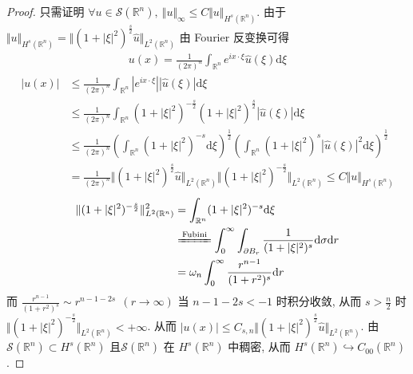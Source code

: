 \documentclass[11pt]{ctexart}[UTF8]
\begin{document}
\begin{proof}
    只需证明 $\forall u \in \mathscr{S}(\mathbb{R}^n),\ \Vert u \Vert_{\infty} \leq C\Vert u \Vert_{H^{s}(\mathbb{R}^n)}$. 由于
    $\Vert u \Vert_{H^{s}(\mathbb{R}^n)} = \Vert (1+|\xi|^{2})^{\frac{s}{2}}\widehat{u} \Vert_{L^{2}(\mathbb{R}^{n})}$ 由 Fourier 反变换可得
    \begin{equation*}
        \begin{aligned}
            u(x) = \frac{1}{(2\pi)^{n}} \int_{\mathbb{R}^n} e^{ix\cdot \xi}\widehat{u}(\xi) \mathrm{d}\xi 
        \end{aligned}
    \end{equation*}
    \begin{equation*}
        \begin{aligned}
            |u(x)| &\leq \frac{1}{(2\pi)^{n}} \int_{\mathbb{R}^n} |e^{ix\cdot \xi}||\widehat{u}(\xi)| \mathrm{d}\xi \\
                     &\leq \frac{1}{(2\pi)^{n}} \int_{\mathbb{R}^n} (1+|\xi|^{2})^{-\frac{s}{2}}(1+|\xi|^{2})^{\frac{s}{2}}|\widehat{u}(\xi)| \mathrm{d}\xi \\
                     &\leq \frac{1}{(2\pi)^{n}} \left( \int_{\mathbb{R}^n} (1+|\xi|^{2})^{-s} \mathrm{d}\xi \right)^{\frac{1}{2}} \left( \int_{\mathbb{R}^n} (1+|\xi|^{2})^{s} |\widehat{u}(\xi)|^2 \mathrm{d}\xi \right)^{\frac{1}{2}}\\
                     & = \frac{1}{(2\pi)^{n}}\Vert (1+|\xi|^{2})^{\frac{s}{2}}\widehat{u} \Vert_{L^{2}(\mathbb{R}^{n})} \Vert (1+|\xi|^{2})^{-\frac{s}{2}} \Vert_{L^{2}(\mathbb{R}^n)} \leq C\Vert u \Vert_{H^{s}(\mathbb{R}^n)}
        \end{aligned}
    \end{equation*}
    \begin{equation*}
        \begin{aligned}
            \Vert (1+|\xi|^{2})^{-\frac{s}{2}} \Vert_{L^{2}(\mathbb{R}^n)}^2 &= \int_{\mathbb{R}^n} (1+|\xi|^{2})^{-s} \mathrm{d}\xi \\
            & \xlongequal{\text{Fubini}} \int_{0}^{\infty} \int_{\partial B_{r}} \frac{1}{(1+|\xi|^{2})^{s}} \mathrm{d}\sigma \mathrm{d}r \\
            & = \omega_{n} \int_{0}^{\infty} \frac{r^{n-1}}{(1+r^{2})^{s}} \mathrm{d}r \\
        \end{aligned}
    \end{equation*}
    而 $\frac{r^{n-1}}{(1+r^{2})^{s}} \sim r^{n-1-2s}\ \ (r \to \infty)$ 当 $n-1-2s < -1$ 时积分收敛, 从而 $s > \frac{n}{2}$ 时 $\Vert (1+|\xi|^{2})^{-\frac{s}{2}} \Vert_{L^{2}(\mathbb{R}^n)} < +\infty$.
    从而 $|u(x)| \leq C_{s,n}\Vert (1+|\xi|^{2})^{\frac{s}{2}}\widehat{u} \Vert_{L^{2}(\mathbb{R}^{n})}$.
    由$\mathscr{S}(\mathbb{R}^n) \subset H^s(\mathbb{R}^n)$ 且$\mathscr{S}(\mathbb{R}^n)$ 在 $H^s(\mathbb{R}^n)$ 中稠密, 从而 $H^{s}(\mathbb{R}^n) \hookrightarrow C_{00}(\mathbb{R}^n)$.
\end{proof}
\end{document}
